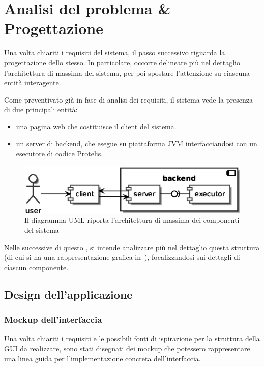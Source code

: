\chapter{Analisi del problema \& Progettazione}\label{ch:project}
  Una volta chiariti i requisiti del sistema, il passo successivo riguarda la progettazione dello stesso.
  In particolare, occorre delineare più nel dettaglio l'architettura di massima del sistema, per poi spostare l'attenzione su ciascuna entità interagente.

  Come preventivato già in fase di analisi dei requisiti, il sistema vede la presenza di due principali entità:

  \begin{itemize}
    \item una pagina web che costituisce il client del sistema.
    \item un server di backend, che esegue su piattaforma JVM interfacciandosi con un esecutore di codice Protelis.
  \end{itemize}

  \begin{figure}[htbp]
    \centering
    \includegraphics[width=.8\textwidth]{res/uml/architecture-design.eps}%
    \caption{Il diagramma UML riporta l'architettura di massima dei componenti del sistema}%
    \label{fig:architecture-design}
  \end{figure}

  Nelle  successive di questo , si intende analizzare più nel dettaglio questa struttura (di cui si ha una rappresentazione grafica in~),
  focalizzandosi sui dettagli di ciascun componente.

  \section{Design dell'applicazione}\label{sec:client-design}

    \subsection{Mockup dell'interfaccia}\label{subsec:mockup}
      Una volta chiariti i requisiti e le possibili fonti di ispirazione per la struttura della GUI da realizzare, sono stati disegnati dei mockup che potessero rappresentare una linea guida
      per l'implementazione concreta dell'interfaccia.

